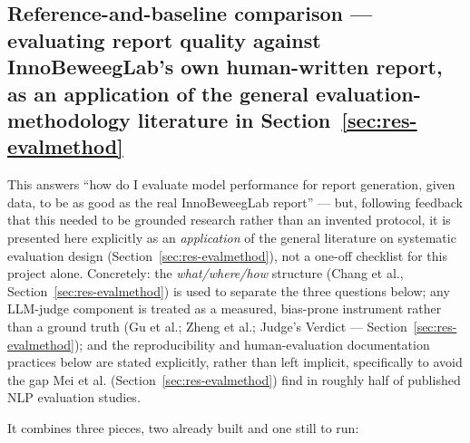 \subsection{Reference-and-baseline comparison — evaluating report quality against InnoBeweegLab's own human-written report, as an application of the general evaluation-methodology literature in \texorpdfstring{Section~\ref{sec:res-evalmethod}}{Section 4.7}}\label{sec:m-reference}

This answers \textquotedblleft{}how do I evaluate model performance for report generation, given data, to be as good as the real InnoBeweegLab report\textquotedblright{} — but, following feedback that this needed to be grounded research rather than an invented protocol, it is presented here explicitly as an \textit{application} of the general literature on systematic evaluation design (Section~\ref{sec:res-evalmethod}), not a one-off checklist for this project alone. Concretely: the \textit{what/where/how} structure (Chang et al., Section~\ref{sec:res-evalmethod}) is used to separate the three questions below; any LLM-judge component is treated as a measured, bias-prone instrument rather than a ground truth (Gu et al.; Zheng et al.; Judge's Verdict — Section~\ref{sec:res-evalmethod}); and the reproducibility and human-evaluation documentation practices below are stated explicitly, rather than left implicit, specifically to avoid the gap Mei et al. (Section~\ref{sec:res-evalmethod}) find in roughly half of published NLP evaluation studies.



It combines three pieces, two already built and one still to run:



